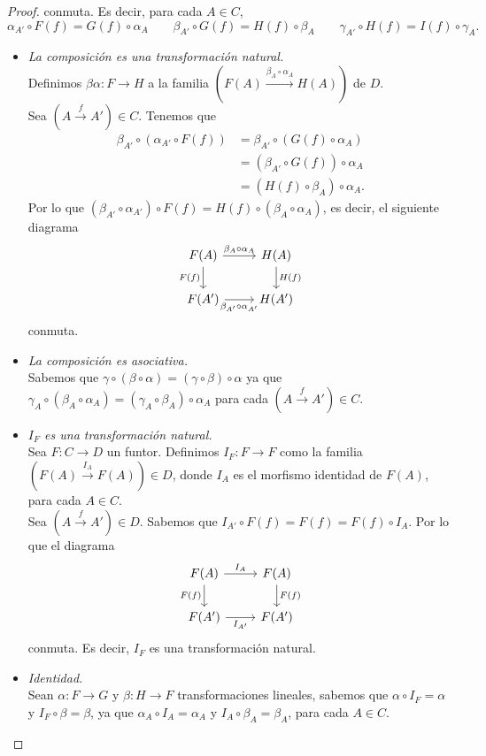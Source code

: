 \begin{proof}
conmuta. Es decir, para cada $A\in C$,
\[\alpha_{A'}\circ F(f)=G(f)\circ \alpha_A \qquad \beta_{A'}\circ G(f)=H(f)\circ \beta_A \qquad \gamma_{A'}\circ H(f)=I(f)\circ \gamma_A.\]
\begin{itemize}
\item[\blacksmiley{}] \textit{La composición es una transformación natural.}\\ Definimos $\beta\alpha\colon F\to H$ a la familia $(F(A)\xrightarrow{\beta_A\circ \alpha_A} H(A))$ de $D$.\\
Sea $(A\xrightarrow{f}A')\in C$. Tenemos que
\begin{align*}
\beta_{A'}\circ(\alpha_{A'}\circ F(f))&=\beta_{A'}\circ(G(f)\circ \alpha_A)\\
&=(\beta_{A'}\circ G(f))\circ \alpha_A\\
&=(H(f)\circ\beta_A)\circ\alpha_A.
\end{align*}
Por lo que $(\beta_{A'}\circ\alpha_{A'})\circ F(f)=H(f)\circ(\beta_A\circ\alpha_A)$, es decir, el siguiente diagrama
\[
\begin{tikzcd}
F(A) \arrow[d, "F(f)"'] \arrow[r, "\beta_A\circ \alpha_A"] & H(A) \arrow[d, "H(f)"] \\
F(A') \arrow[r, "\beta_{A'}\circ\alpha_{A'}"']             & H(A')                 
\end{tikzcd}
\]
conmuta.
\item[\blacksmiley{}] \textit{La composición es asociativa.}\\
Sabemos que $\gamma\circ (\beta\circ\alpha)=(\gamma\circ\beta)\circ\alpha$ ya que $\gamma_A\circ(\beta_A\circ\alpha_A)=(\gamma_A\circ\beta_A)\circ\alpha_A$ para cada $(A\xrightarrow{f} A')\in C$.
\item[\blacksmiley{}] \textit{$I_F$ es una transformación natural.}\\
Sea $F\colon C\to D$ un funtor. Definimos $I_F\colon F\to F$ como la familia $(F(A)\xrightarrow{I_A}F(A))\in D$, donde $I_A$ es el morfismo identidad de $F(A)$, para cada $A\in C$.\\
Sea $(A\xrightarrow{f} A')\in D$. Sabemos que $I_{A'}\circ F(f)=F(f)=F(f)\circ I_A$. Por lo que el diagrama
\[
\begin{tikzcd}
F(A) \arrow[d, "F(f)"'] \arrow[r, "I_A"] & F(A) \arrow[d, "F(f)"] \\
F(A') \arrow[r, "I_{A'}"']               & F(A')                 
\end{tikzcd}
\]
conmuta. Es decir, $I_F$ es una transformación natural.
\item[\blacksmiley{}] \textit{Identidad.}\\
Sean $\alpha\colon F\to G$ y $\beta\colon H\to F$ transformaciones lineales, sabemos que $\alpha\circ I_F=\alpha$ y $I_F\circ \beta=\beta$, ya que $\alpha_A\circ I_A=\alpha_A$ y $I_A\circ\beta_A=\beta_A$, para cada $A\in C$.
\end{itemize}
\end{proof}

